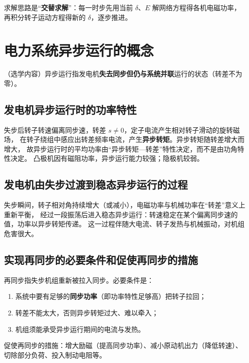 求解思路是“\textbf{交替求解}”：每一时步先用当前 $\delta$、$E$ 解网络方程得各机电磁功率，
再积分转子运动方程得新的 $\delta$，逐步推进。

\section{电力系统异步运行的概念}

（选学内容）异步运行指发电机\textbf{失去同步但仍与系统并联}运行的状态（转差不为零）。

\subsection{发电机异步运行时的功率特性}

失步后转子转速偏离同步速，转差 $s\ne0$，定子电流产生相对转子滑动的旋转磁场，
在转子绕组中感应出转差频率电流，产生\textbf{异步转矩}。异步转矩随转差增大而增大，
故异步运行时的平均功率由“异步转矩—转差”特性决定，而不是由功角特性决定。
凸极机因有磁阻功率，异步运行能力较强；隐极机较弱。

\subsection{发电机由失步过渡到稳态异步运行的过程}

失步瞬间，转子相对角持续增大（或减小），电磁功率与机械功率在“转差”意义上重新平衡，
经过一段振荡后进入稳态异步运行：转速稳定在某个偏离同步速的值，功率以异步转矩传递。
这一过程伴随大电流、转子发热与机械振动，对机组危害很大。

\subsection{实现再同步的必要条件和促使再同步的措施}

再同步指失步机组重新被拉入同步。必要条件是：
\begin{enumerate}
  \item 系统中要有足够的\textbf{同步功率}（即功率特性足够高）把转子拉回；
  \item 转差不能太大，否则异步转矩过大、难以牵入；
  \item 机组须能承受异步运行期间的电流与发热。
\end{enumerate}
促使再同步的措施：增大励磁（提高同步功率）、减小原动机出力（降低转速）、
切除部分负荷、投入制动电阻等。

